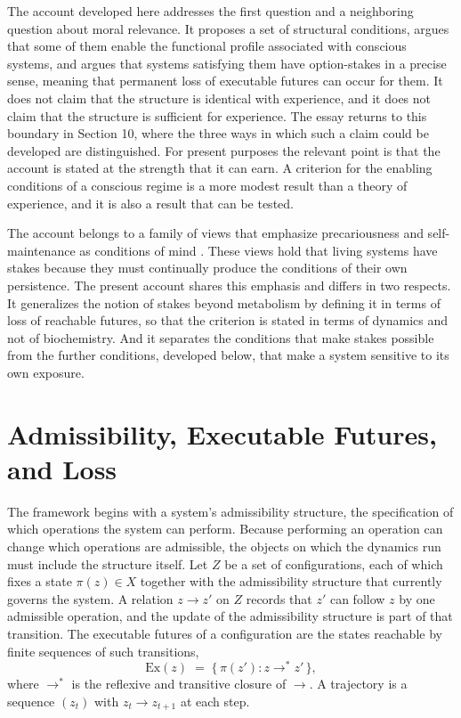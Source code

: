 \documentclass[11pt]{article}
\theoremstyle{definition}
\theoremstyle{plain}
\theoremstyle{remark}
\begin{document}
The account developed here addresses the first question and a neighboring question about moral relevance. It proposes a set of structural conditions, argues that some of them enable the functional profile associated with conscious systems, and argues that systems satisfying them have option-stakes in a precise sense, meaning that permanent loss of executable futures can occur for them. It does not claim that the structure is identical with experience, and it does not claim that the structure is sufficient for experience. The essay returns to this boundary in Section 10, where the three ways in which such a claim could be developed are distinguished. For present purposes the relevant point is that the account is stated at the strength that it can earn. A criterion for the enabling conditions of a conscious regime is a more modest result than a theory of experience, and it is also a result that can be tested.

The account belongs to a family of views that emphasize precariousness and self-maintenance as conditions of mind \cite{jonas1966,maturana1980,thompson2007}. These views hold that living systems have stakes because they must continually produce the conditions of their own persistence. The present account shares this emphasis and differs in two respects. It generalizes the notion of stakes beyond metabolism by defining it in terms of loss of reachable futures, so that the criterion is stated in terms of dynamics and not of biochemistry. And it separates the conditions that make stakes possible from the further conditions, developed below, that make a system sensitive to its own exposure.

\section{Admissibility, Executable Futures, and Loss}

The framework begins with a system's admissibility structure, the specification of which operations the system can perform. Because performing an operation can change which operations are admissible, the objects on which the dynamics run must include the structure itself. Let $Z$ be a set of configurations, each of which fixes a state $\pi(z) \in X$ together with the admissibility structure that currently governs the system. A relation $z \to z'$ on $Z$ records that $z'$ can follow $z$ by one admissible operation, and the update of the admissibility structure is part of that transition. The executable futures of a configuration are the states reachable by finite sequences of such transitions,
\[
\mathrm{Ex}(z) \;=\; \{\, \pi(z') : z \to^{*} z' \,\},
\]
where $\to^{*}$ is the reflexive and transitive closure of $\to$. A trajectory is a sequence $(z_t)$ with $z_t \to z_{t+1}$ at each step.
\end{document}
